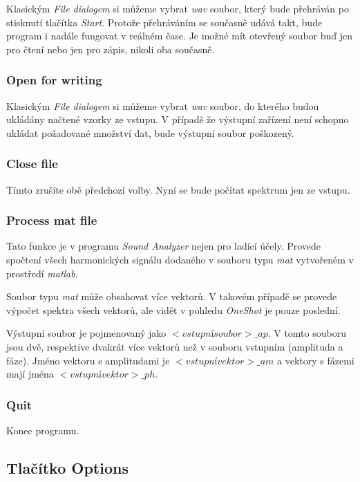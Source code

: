Klasickým \emph{File dialogem} si můžeme vybrat \emph{wav} soubor, který bude přehráván po stisknutí tlačítka \emph{Start}. Protože přehráváním se současně udává takt, bude program i nadále fungovat v reálném čase. Je možné mít otevřený soubor buď jen pro čtení nebo jen pro zápis, nikoli oba současně.

\subsubsection{Open for writing}

Klasickým \emph{File dialogem} si můžeme vybrat \emph{wav} soubor, do kterého budou ukládány načtené vzorky ze vstupu. V případě že výstupní zařízení není schopno ukládat požadované množství dat, bude výstupní soubor poškozený. 

\subsubsection{Close file}

Tímto zrušíte obě předchozí volby. Nyní se bude počítat spektrum jen ze vstupu.

\subsubsection{Process mat file}

Tato funkce je v programu \emph{Sound Analyzer} nejen pro ladící účely. Provede spočtení všech harmonických signálu dodaného v souboru typu \emph{mat} vytvořeném v prostředí \emph{matlab}.

Soubor typu \emph{mat} může obsahovat více vektorů. V takovém případě se provede výpočet spektra všech vektorů, ale vidět v pohledu \emph{OneShot} je pouze poslední.

Výstupní soubor je pojmenovaný jako $<vstupní soubor>\_ap$. V tomto souboru jsou dvě,
respektive dvakrát více vektorů než v souboru vstupním (amplituda a fáze). Jméno vektoru s amplitudami
 je $<vstupní vektor>\_am$ a vektory s fázemi mají jména $<vstupní vektor>\_ph$.

\subsubsection{Quit}

Konec programu.

\subsection{Tlačítko Options}

